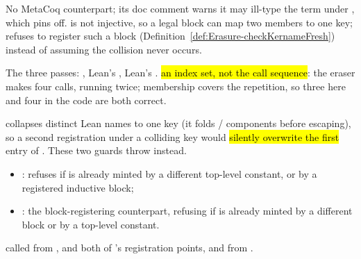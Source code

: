 \begin{remark}
 No MetaCoq counterpart; its doc comment warns it may ill-type the term under
, which  pins off.  is not injective,
so a legal  block can map two members to one \lbox{} key;
 refuses to register such a block (Definition~\ref{def:Erasure-checkKernameFresh})
instead of assuming the collision never occurs.
\end{remark}

\begin{definition}
\label{def:preparePasses}
\leanok
{} The three  passes: , Lean's
, Lean's .
 \hl{an index set, not the call sequence}: the eraser makes four calls, running
 twice; membership covers the repetition, so three here and four in the code are
both correct.
\end{definition}

\begin{definition}
\label{def:Erasure-checkKernameFresh}
\leanok
{}  collapses distinct Lean names to one \lbox{} key (it folds
/ components before escaping), so a second registration under a colliding
key would \hl{silently overwrite the first} entry of . These two guards throw
instead.
\begin{itemize}
\item {}: refuses if  is already minted by a different
top-level constant, or by a registered inductive block;
\item {}: the block-registering counterpart, refusing if
 is already minted by a different block or by a top-level constant.
\end{itemize}
 called from ,  and both of 's
registration points, and from .
\end{definition}

